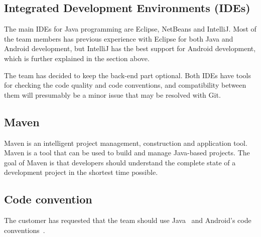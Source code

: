 \subsection{Integrated Development Environments (IDEs)}
The main IDEs for Java programming are Eclipse, NetBeans and IntelliJ. Most of the team members has previous experience with Eclipse for both Java and Android development, but IntelliJ has the best support for Android development, which is further explained in the section above.

The team has decided to keep the back-end part optional. Both IDEs have tools for checking the code quality and code conventions, and compatibility between them will presumably be a minor issue that may be resolved with Git.

\subsection{Maven}
Maven is an intelligent project management, construction and application tool. Maven is a tool that can be used to build and manage Java-based projects. The goal of Maven is that developers should understand the complete state of a development project in the shortest time possible.

\subsection{Code convention}
The customer has requested that the team should use Java~\cite{javaconv} and Android's code conventions~\cite{androidconv}.

